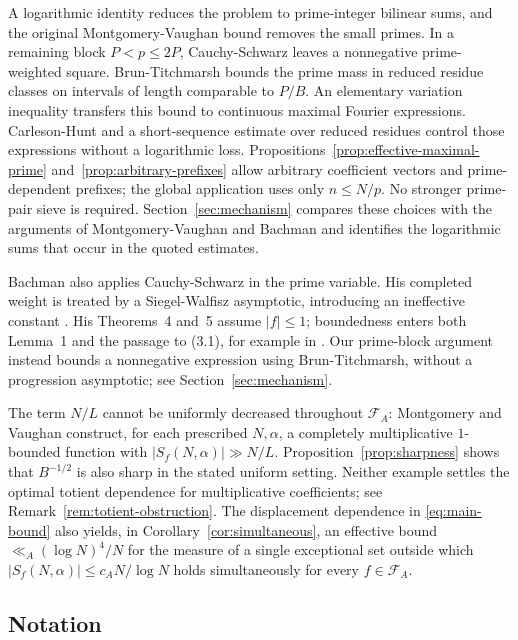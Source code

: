 \documentclass[11pt]{amsart}
\numberwithin{equation}{section}
\numberwithin{figure}{section}
\theoremstyle{definition}
\newcommand{\FA}{\mathcal F_A}
\begin{document}
A logarithmic identity reduces the problem to prime-integer bilinear
sums, and the original Montgomery-Vaughan bound removes the small
primes. In a remaining block $P<p\le2P$, Cauchy-Schwarz leaves a
nonnegative prime-weighted square. Brun-Titchmarsh bounds the prime
mass in reduced residue classes on intervals of length comparable
to $P/B$. An elementary variation inequality transfers this bound
to continuous maximal Fourier expressions. Carleson-Hunt and a
short-sequence estimate over reduced residues control those expressions
without a logarithmic loss. Propositions~\ref{prop:effective-maximal-prime}
and~\ref{prop:arbitrary-prefixes} allow arbitrary coefficient vectors
and prime-dependent prefixes; the global application uses only
$n\le N/p$. No stronger prime-pair sieve is required.
Section~\ref{sec:mechanism} compares these choices with the arguments
of Montgomery-Vaughan and Bachman and identifies the logarithmic
sums that occur in the quoted estimates.

Bachman also applies Cauchy-Schwarz in the prime variable. His
completed weight is treated by a Siegel-Walfisz asymptotic, introducing
an ineffective constant \cite[equations~(2.6)-(2.7)]{Bachman}.
His Theorems~4 and~5 assume $|f|\le1$; boundedness enters both
Lemma~1 and the passage to (3.1), for example in
\cite[equations~(2.6), (2.14), and~(3.1)]{Bachman}.
Our prime-block argument instead bounds a nonnegative expression
using Brun-Titchmarsh, without a progression asymptotic; see
Section~\ref{sec:mechanism}.

The term $N/L$ cannot be uniformly decreased throughout $\FA$:
Montgomery and Vaughan \cite[Section~7, example~(i)]{MV} construct,
for each prescribed $N,\alpha$, a completely multiplicative
$1$-bounded function with $|S_f(N,\alpha)|\gg N/L$.
Proposition~\ref{prop:sharpness} shows that $B^{-1/2}$ is also sharp
in the stated uniform setting. Neither example settles the optimal
totient dependence for multiplicative coefficients; see
Remark~\ref{rem:totient-obstruction}.
The displacement dependence in \eqref{eq:main-bound} also yields, in
Corollary~\ref{cor:simultaneous}, an effective bound
$\ll_A(\log N)^4/N$ for the measure of a single exceptional set outside
which $|S_f(N,\alpha)|\le c_AN/\log N$ holds simultaneously for every
$f\in\FA$.

\subsection{Notation}\label{sec:notation}
\end{document}
